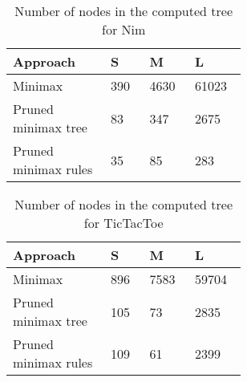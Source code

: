 \begin{minipage}{0.5\linewidth}
    \centering
    \begin{table}[H]
        \small
        \setlength{\tabcolsep}{0.5em}
        \def\arraystretch{1.1}
        \begin{threeparttable}
            \begin{tabular}{L{0.30\linewidth} p{0.09\linewidth}p{0.09\linewidth}p{0.1\linewidth}}
                \toprule[0.25mm]
                Approach & S & M & L
                \\
                \midrule[0.35mm]
                Minimax  & 390 & 4630 & 61023
                \\[20pt]
                Pruned minimax tree   & 83 & 347 & 2675
                \\[20pt]
                Pruned minimax rules & 35 & 85 & 283 
                \\
                \bottomrule[0.25mm]
            \end{tabular}
            \caption{Number of nodes in the computed tree for Nim}
        \end{threeparttable}
    \end{table}
\end{minipage}
\begin{minipage}{0.5\linewidth}
    \centering
    \begin{table}[H]
        \small
        \setlength{\tabcolsep}{0.5em}
        \def\arraystretch{1.1}
        \begin{threeparttable}
            \begin{tabular}{L{0.30\linewidth} p{0.09\linewidth}p{0.09\linewidth}p{0.1\linewidth}}
                \toprule[0.25mm]
                Approach & S & M & L
                \\
                \midrule[0.35mm]
                Minimax  & 896 & 7583 & 59704
                \\[20pt]
                Pruned minimax tree   & 105 & 73 & 2835
                \\[20pt]
                Pruned minimax rules & 109 & 61 & 2399 
                \\
                \bottomrule[0.25mm]
            \end{tabular}
            \caption{Number of nodes in the computed tree for TicTacToe}
        \end{threeparttable}
    \end{table}
\end{minipage}

